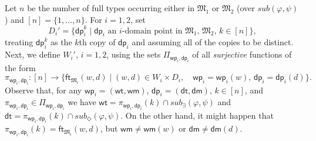 \documentclass[10pt,a4paper]{amsart}
\theoremstyle{plain}
\theoremstyle{definition}
\newcommand{\sub}{\textit{sub}}
\newcommand{\wt}{\mathsf{wt}}
\newcommand{\dt}{\mathsf{dt}}
\newcommand{\ft}{\mathsf{ft}}
\newcommand{\wm}{\mathsf{wm}}
\newcommand{\dm}{\mathsf{dm}}
\newcommand{\iwp}{\mathsf{wp}_i}
\newcommand{\idp}{\mathsf{dp}_i}
\begin{document}
%

Let $n$ be the number of full types occurring either in $\mathfrak M_1$ or $\mathfrak M_2$ (over $\sub(\varphi, \psi)$) and $[n] = \{1,\dots,n\}$. For $i = 1,2$, set 
%
\begin{equation*}
D_{i}' = \{ \idp^k \mid \idp \text{ an $i$-domain point in $\mathfrak{M}_{1}$, $\mathfrak{M}_{2}$, $k \in [n]$} \},
\end{equation*}
%
treating $\idp^k$ as the $k$th copy of $\idp$ and assuming all of the copies to be distinct. 
Next, we define $W_{i}'$, $i=1,2$, using the sets $\Pi_{\iwp,\idp}$ of all \emph{surjective} functions of the form
%
$$
\pi_{\iwp,\idp} \colon [n] \to \{ \ft_{\mathfrak{M}_{i}}(w,d) \mid \text{$(w,d)\in W_{i} \times D_{i}$},\quad \text{$\iwp=\iwp(w)$, $\idp = \idp(d)$}\}.
$$
%
Observe that, for any $\iwp = (\wt,\wm)$, $\idp = (\dt,\dm)$, $k\in [n]$, and
$\pi_{\iwp,\idp}\in \Pi_{\iwp,\idp}$ we have $\wt = \pi_{\iwp,\idp}(k) \cap \sub_\exists(\varphi,\psi)$ and $\dt =  \pi_{\iwp,\idp}(k) \cap \sub_\Diamond (\varphi,\psi)$. On the other hand, it might happen that $\pi_{\iwp,\idp}(k) = \ft_{\mathfrak{M}_{i}}(w,d)$,
but $\wm\ne \wm(w)$ or $\dm\ne\dm(d)$.  
%
\end{document}
